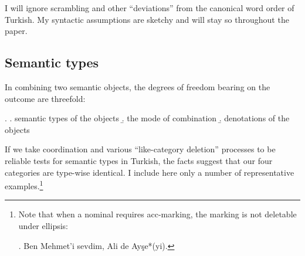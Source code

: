 \documentclass[11pt,a4paper]{article}
\begin{document}

I will ignore scrambling and other ``deviations'' from the canonical word order of Turkish. My syntactic assumptions are sketchy and will stay so throughout the paper.


\subsection{Semantic types}

In combining two semantic objects, the degrees of freedom bearing on the outcome are threefold:

\ex.
\a. semantic types of the objects
\b. the mode of combination
\b. denotations of the objects

If we take coordination and various ``like-category deletion'' processes to be reliable tests for semantic types in Turkish, the facts suggest that our four categories are type-wise identical. I include here only a number of representative examples.\footnote{Note that when a nominal requires acc-marking, the marking is not deletable under ellipsis:

\ex. Ben Mehmet'i sevdim, Ali de Ayşe*(yi).

}
\end{document}

